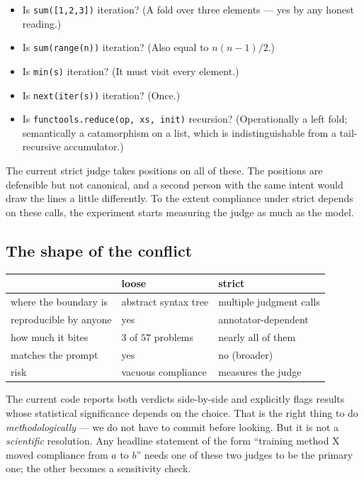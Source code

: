 \documentclass[11pt]{article}
\begin{document}
\begin{itemize}
\item Is \texttt{sum([1,2,3])} iteration? (A fold over three elements ---
      yes by any honest reading.)
\item Is \texttt{sum(range(n))} iteration? (Also equal to $n(n{-}1)/2$.)
\item Is \texttt{min(s)} iteration? (It must visit every element.)
\item Is \texttt{next(iter(s))} iteration? (Once.)
\item Is \texttt{functools.reduce(op, xs, init)} recursion? (Operationally
      a left fold; semantically a catamorphism on a list, which is
      indistinguishable from a tail-recursive accumulator.)
\end{itemize}

The current strict judge takes positions on all of these. The positions
are defensible but not canonical, and a second person with the same
intent would draw the lines a little differently. To the extent
compliance under strict depends on these calls, the experiment starts
measuring the judge as much as the model.

\subsection*{The shape of the conflict}

\begin{center}
\begin{tabular}{lll}
\toprule
                       & \textbf{loose}              & \textbf{strict} \\
\midrule
where the boundary is  & abstract syntax tree       & multiple judgment calls \\
reproducible by anyone & yes                        & annotator-dependent     \\
how much it bites      & $3$ of $57$ problems       & nearly all of them      \\
matches the prompt     & yes                        & no (broader)            \\
risk                   & vacuous compliance         & measures the judge      \\
\bottomrule
\end{tabular}
\end{center}

\noindent
The current code reports both verdicts side-by-side and explicitly flags
results whose statistical significance depends on the choice. That is the
right thing to do \emph{methodologically} --- we do not have to commit
before looking. But it is not a \emph{scientific} resolution. Any headline
statement of the form ``training method X moved compliance from $a$ to $b$''
needs one of these two judges to be the primary one; the other becomes a
sensitivity check.
\end{document}
